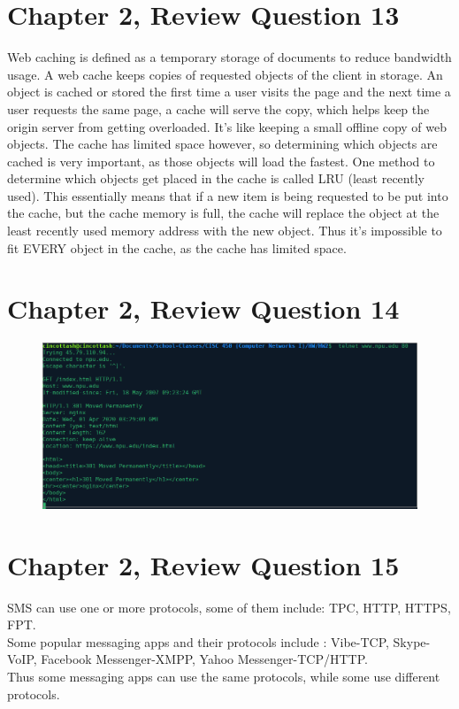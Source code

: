\documentclass{article}
\begin{document}
\section{Chapter 2, Review Question 13}
Web caching is defined as a temporary storage of documents to reduce bandwidth usage.  A web cache keeps copies of requested objects of the client in storage.  An object is cached or stored the first time a user visits the page and the next time a user requests the same page, a cache will serve the copy, which helps keep the origin server from getting overloaded.  It's like keeping a small offline copy of web objects.  The cache has limited space however, so determining which objects are cached is very important, as those objects will load the fastest.  One method to determine which objects get placed in the cache is called LRU (least recently used).  This essentially means that if a new item is being requested to be put into the cache, but the cache memory is full, the cache will replace the object at the least recently used memory address with the new object.  Thus it's impossible to fit EVERY object in the cache, as the cache has limited space.\\

\clearpage

\section{Chapter 2, Review Question 14}

\begin{figure}[h!]
\centering
\includegraphics[scale=0.45]{RQ14.png}
\caption{}
\end{figure}


\section{Chapter 2, Review Question 15}
SMS can use one or more protocols, some of them include: TPC, HTTP, HTTPS, FPT.\\
\newline Some popular messaging apps and their protocols include : Vibe-TCP, Skype-VoIP, Facebook Messenger-XMPP, Yahoo Messenger-TCP/HTTP.\\
\newline Thus some messaging apps can use the same protocols, while some use different protocols.\\
\end{document}
